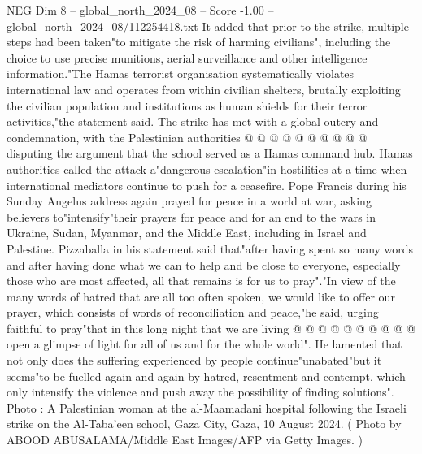 \begin{textsample}{NEG Dim 8 – global\_north\_2024\_08 – Score -1.00 – global\_north\_2024\_08/112254418.txt}
It added that prior to the strike, multiple steps had been taken"to mitigate the risk of harming civilians", including the choice to use precise munitions, aerial surveillance and other intelligence information."The Hamas terrorist organisation systematically violates international law and operates from within civilian shelters, brutally exploiting the civilian population and institutions as human shields for their terror activities,"the statement said.
The strike has met with a global outcry and condemnation, with the Palestinian authorities @ @ @ @ @ @ @ @ @ @ disputing the argument that the school served as a Hamas command hub.
Hamas authorities called the attack a"dangerous escalation"in hostilities at a time when international mediators continue to push for a ceasefire.
Pope Francis during his Sunday Angelus address again prayed for peace in a world at war, asking believers to"intensify"their prayers for peace and for an end to the wars in Ukraine, Sudan, Myanmar, and the Middle East, including in Israel and Palestine.
Pizzaballa in his statement said that"after having spent so many words and after having done what we can to help and be close to everyone, especially those who are most affected, all that remains is for us to pray"."In view of the many words of hatred that are all too often spoken, we would like to offer our prayer, which consists of words of reconciliation and peace,"he said, urging faithful to pray"that in this long night that we are living @ @ @ @ @ @ @ @ @ @ open a glimpse of light for all of us and for the whole world".
He lamented that not only does the suffering experienced by people continue"unabated"but it seems"to be fuelled again and again by hatred, resentment and contempt, which only intensify the violence and push away the possibility of finding solutions".
Photo : A Palestinian woman at the al-Maamadani hospital following the Israeli strike on the Al-Taba'een school, Gaza City, Gaza, 10 August 2024. ( Photo by ABOOD ABUSALAMA/Middle East Images/AFP via Getty Images. )

\end{textsample}
